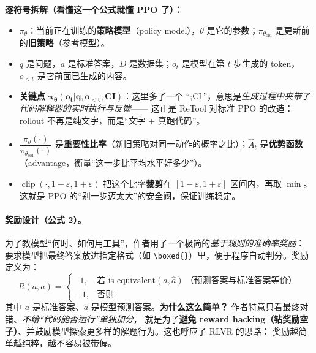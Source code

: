 \documentclass[11pt,UTF8,fontset=fandol]{ctexart}
\begin{document}
\textbf{逐符号拆解（看懂这一个公式就懂 PPO 了）：}
\begin{itemize}[leftmargin=1.6em,itemsep=1pt]
  \item $\pi_\theta$：当前正在训练的\textbf{策略模型}（policy model），$\theta$ 是它的参数；$\pi_{\theta_{\text{old}}}$ 是更新前的\textbf{旧策略}（参考模型）。
  \item $q$ 是问题，$a$ 是标准答案，$D$ 是数据集；$o_t$ 是模型在第 $t$ 步生成的 token，$o_{<t}$ 是它前面已生成的内容。
  \item \textbf{关键点 }$\boldsymbol{\pi_\theta(o_t|q,o_{<t};\text{CI})}$：这里多了一个 “$;\text{CI}$”，意思是\emph{生成过程中夹带了代码解释器的实时执行与反馈}——
  这正是 ReTool 对标准 PPO 的改造：rollout 不再是纯文字，而是“文字 + 真跑代码”。
  \item $\dfrac{\pi_\theta(\cdot)}{\pi_{\theta_{\text{old}}}(\cdot)}$ 是\textbf{重要性比率}（新旧策略对同一动作的概率之比）；$\hat{A}_t$ 是\textbf{优势函数}
  （advantage，衡量“这一步比平均水平好多少”）。
  \item $\operatorname{clip}(\cdot,1-\varepsilon,1+\varepsilon)$ 把这个比率\textbf{裁剪}在 $[1-\varepsilon,1+\varepsilon]$ 区间内，再取 $\min$。
  这就是 PPO 的“别一步迈太大”的安全阀，保证训练稳定。
\end{itemize}

\paragraph{奖励设计（公式 2）。} 为了教模型“何时、如何用工具”，作者用了一个极简的\emph{基于规则的准确率奖励}：
要求模型把最终答案放进指定格式（如 \verb|\boxed{}|）里，便于程序自动判分。奖励定义为：
\begin{equation*}
R(a,\hat{a})=
\begin{cases}
\;\;1, & \text{若 } \mathrm{is\_equivalent}(a,\hat{a})\ \text{（预测答案与标准答案等价）}\\[2pt]
-1, & \text{否则}
\end{cases}
\end{equation*}
其中 $a$ 是标准答案、$\hat{a}$ 是模型预测答案。\textbf{为什么这么简单？} 作者特意只看最终对错、\emph{不给“代码能否运行”单独加分}，
就是为了\textbf{避免 reward hacking（钻奖励空子）}、并鼓励模型探索更多样的解题行为。这也呼应了 RLVR 的思路：
奖励越简单越纯粹，越不容易被带偏。
\end{document}

